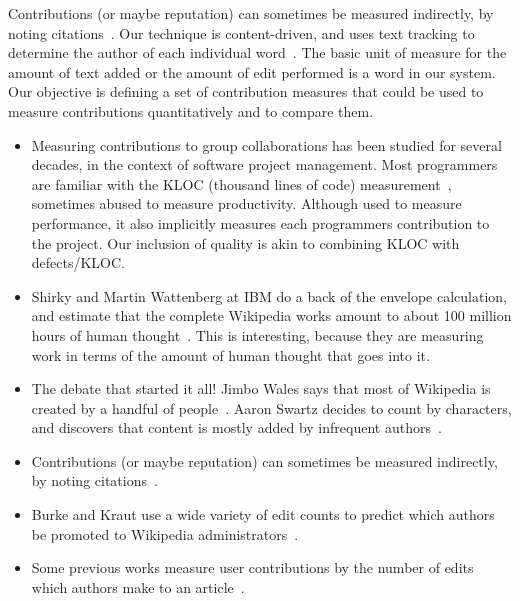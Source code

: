 Contributions (or maybe reputation) can sometimes be measured 
indirectly, by noting 
citations~\cite{PageRank98,Giles2004,WikiMTWtrust06}.
Our technique is content-driven, and uses text tracking
to determine the author of each individual 
word~\cite{RankingControversies2008,Adler2007}.
The basic unit of measure for the amount of text added or the
amount of edit performed is a word in our system.
Our objective is defining a set of contribution measures
that could be used to measure contributions quantitatively
and to compare them.

\begin{itemize}

\item Measuring contributions to group collaborations has been
	studied for several decades, in the context of
	software project management.
	Most programmers are familiar with the KLOC
	(thousand lines of code) measurement~\cite{MITRE1988,Park1992},
	sometimes abused to measure productivity.
	Although used to measure performance, it also
	implicitly measures each programmers contribution
	to the project. 
    Our inclusion of quality is akin
	to combining KLOC with defects/KLOC.

\item Shirky and Martin Wattenberg at IBM do a back of the
        envelope calculation, and estimate that the complete Wikipedia
	works amount to about 100 million hours of human
	thought~\cite{CognitiveSurplus2008}.
	This is interesting, because they are measuring work
	in terms of the amount of human thought that goes into it.

\item The debate that started it all!
	Jimbo Wales says that most of Wikipedia is created by
	a handful of people~\cite{Wales2005}.
	Aaron Swartz decides to count by characters,
	and discovers that content is mostly added
	by infrequent authors~\cite{Swartz2006}.

\item Contributions (or maybe reputation) can sometimes be measured indirectly,
	by noting citations~\cite{PageRank98,Giles2004,WikiMTWtrust06}.

\item Burke and Kraut use a wide variety of edit counts to predict
	which authors be promoted to Wikipedia administrators~\cite{AdministratorMop2008}.

\item Some previous works measure user contributions by the number
	of edits which authors make to an
	article~\cite{Wales2005,EditsEqQuality2007,Kittur2007,
	WikiDashboard2008,OrtegaBarahona2007,SteinHess2007}.


\end{itemize}
